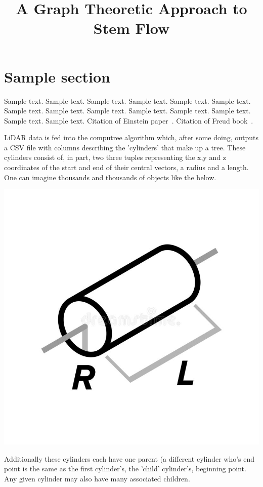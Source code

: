 \documentclass[jou,apacite]{apa6}
\title{A Graph Theoretic Approach to Stem Flow}
\begin{document}
\maketitle    
                        
\section{Sample section}
Sample text. Sample text. Sample text. Sample text. Sample text. Sample text. 
Sample text. Sample text. Sample text. Sample text. Sample text. Sample text. 
Sample text. Sample text. Citation of Einstein paper~\cite{Einstein}. Citation of Freud book~\cite{Freud}.

LiDAR data is fed into the computree algorithm which, after some doing, outputs a CSV file with columns describing the 'cylinders' that make up a tree. These cylinders consist of, in part, two three tuples representing the x,y and z coordinates of the start and end of their central vectors, a radius and a length. One can imagine thousands and thousands of objects like the below.

\includegraphics{cylinderex.jpg}

Additionally these cylinders each have one parent (a different cylinder who's end point is the same as the first cylinder's, the 'child' cylinder's, beginning point. Any given cylinder may also have many associated children.
\end{document}
